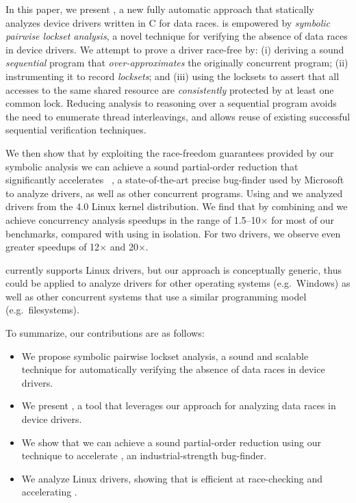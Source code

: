In this paper, we present \whoop, a new fully automatic approach that statically analyzes device drivers written in C for data races. \whoop is empowered by \emph{symbolic pairwise lockset analysis}, a novel technique for verifying the absence of data races in device drivers. We attempt to prove a driver race-free by: (i) deriving a sound \emph{sequential} program that \emph{over-approximates} the originally concurrent program; (ii) instrumenting it to record \emph{locksets}; and (iii) using the locksets to assert that all accesses to the same shared resource are \emph{consistently} protected by at least one common lock. Reducing analysis to reasoning over a sequential program avoids the need to enumerate thread interleavings, and allows reuse of existing successful sequential verification techniques.

We then show that by exploiting the race-freedom guarantees provided by our symbolic analysis we can achieve a sound partial-order reduction that significantly accelerates \corral~\cite{lal2012corral}, a state-of-the-art precise bug-finder used by Microsoft to analyze drivers, as well as other concurrent programs. Using \whoop and \corral we analyzed \sizeOfBenchmarks drivers from the 4.0 Linux kernel distribution.  We find that by combining \whoop and \corral we achieve concurrency analysis speedups in the range of 1.5--10$\times$ for most of our benchmarks, compared with using \corral in isolation.  For two drivers, we observe even greater speedups of 12$\times$ and 20$\times$.

\whoop currently supports Linux drivers, but our approach is conceptually generic, thus could be applied to analyze drivers for other operating systems (e.g.\ Windows) as well as other concurrent systems that use a similar programming model (e.g.\ filesystems).

To summarize, our contributions are as follows:
\begin{itemize}
\item We propose symbolic pairwise lockset analysis, a sound and scalable technique for automatically verifying the absence of data races in device drivers.
\item We present \whoop, a tool that leverages our approach for analyzing data races in device drivers.
\item We show that we can achieve a sound partial-order reduction using our technique to accelerate \corral, an industrial-strength bug-finder.
\item We analyze \sizeOfBenchmarks Linux drivers, showing that \whoop is efficient at race-checking and accelerating \corral.
\end{itemize}

